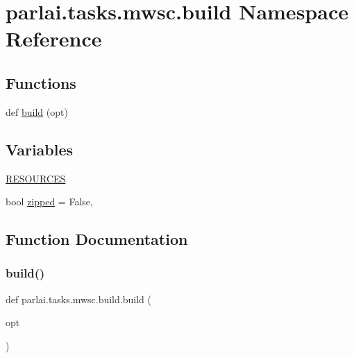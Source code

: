 \hypertarget{namespaceparlai_1_1tasks_1_1mwsc_1_1build}{}\section{parlai.\+tasks.\+mwsc.\+build Namespace Reference}
\label{namespaceparlai_1_1tasks_1_1mwsc_1_1build}
\subsection*{Functions}
\begin{DoxyCompactItemize}
\item 
def \hyperlink{namespaceparlai_1_1tasks_1_1mwsc_1_1build_a21fb0afba67df57037a48b4250337077}{build} (opt)
\end{DoxyCompactItemize}
\subsection*{Variables}
\begin{DoxyCompactItemize}
\item 
\hyperlink{namespaceparlai_1_1tasks_1_1mwsc_1_1build_a7b7842b18b674a1b523b16617f65908a}{R\+E\+S\+O\+U\+R\+C\+ES}
\item 
bool \hyperlink{namespaceparlai_1_1tasks_1_1mwsc_1_1build_aa47e77bae482dfa924fdb05fd14084fd}{zipped} = False,
\end{DoxyCompactItemize}


\subsection{Function Documentation}
\mbox{\label{namespaceparlai_1_1tasks_1_1mwsc_1_1build_a21fb0afba67df57037a48b4250337077}} 
\subsubsection{\texorpdfstring{build()}{build()}}
{\footnotesize\ttfamily def parlai.\+tasks.\+mwsc.\+build.\+build (\begin{DoxyParamCaption}\item[{}]{opt }\end{DoxyParamCaption})}




